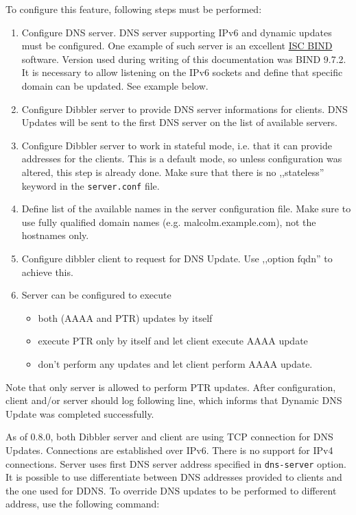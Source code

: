 To configure this feature, following steps must be performed:

\begin{enumerate}
\item Configure DNS server. DNS server supporting IPv6 and dynamic
  updates must be configured. One example of such server is an
  excellent \href{http://www.isc.org/software/bind}{ISC BIND}
  software. Version used during writing of this documentation was BIND
  9.7.2. It is necessary to allow listening on the IPv6 sockets and
  define that specific domain can be updated. See example below.
\item Configure Dibbler server to provide DNS server informations for
  clients. DNS Updates will be sent to the first DNS server on the
  list of available servers.
\item Configure Dibbler server to work in stateful mode, i.e. that it
  can provide addresses for the clients. This is a default mode, so
  unless configuration was altered, this step is already done. Make
  sure that there is no ,,stateless'' keyword in the
  \verb+server.conf+ file.
\item Define list of the available names in the server configuration
  file. Make sure to use fully qualified domain names
  (e.g. malcolm.example.com), not the hostnames only.
\item Configure dibbler client to request for DNS Update. Use ,,option
  fqdn'' to achieve this.
\item Server can be configured to execute
      \begin{itemize}
       \item both (AAAA and PTR) updates by itself
       \item execute PTR only by itself and let client execute AAAA
             update
       \item don't perform any updates and let client perform AAAA
             update.
      \end{itemize}
\end{enumerate}

Note that only server is allowed to perform PTR updates. After
configuration, client and/or server should log following line, which
informs that Dynamic DNS Update was completed successfully.

As of 0.8.0, both Dibbler server and client are using TCP connection
for DNS Updates. Connections are established over IPv6. There is no
support for IPv4 connections. Server uses first DNS server address
specified in \verb+dns-server+ option. It is possible to use
differentiate between DNS addresses provided to clients and the one
used for DDNS. To override DNS updates to be performed to different
address, use the following command:

